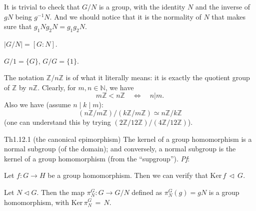 \documentclass{article}
\newcommand{\nles}{\vartriangleleft}
\newcommand{\Ker}{\text{Ker}\,}
\begin{document}
\begin{Rmk}{}
    \begin{compactenum}
        \item It is trivial to check that $G/N$ is a group, \textcolor{Th}{with the identity $N$ and the inverse of $gN$ being $g^{-1}N$}. And we should notice that it is the normality of $N$ that makes sure that $g_1Ng_2N = g_1g_2N$.
        \item \textcolor{Th}{$|G/N| = [G:N]$}.
        \item \textcolor{Th}{$G/{1} = \{G\}$, $G/G = \{1\}$}.
        \item \textcolor{Th}{The notation $\mathbb{Z}/n\mathbb{Z}$ is of what it literally means: it is exactly the quotient group of $\mathbb{Z}$ by $n\mathbb{Z}$. Clearly, for $m,n\in\mathbb{N}$, we have
        $$ m\mathbb{Z}<n\mathbb{Z} \quad \Longleftrightarrow \quad n|m. $$
        Also we have (assume $n\mid k\mid m$):
        $$ (n\mathbb{Z}/m\mathbb{Z})\Big/ (k\mathbb{Z}/m\mathbb{Z}) \simeq n\mathbb{Z}/k\mathbb{Z} $$
        (one can understand this by trying $(2\mathbb{Z}/12\mathbb{Z})\big/ (4\mathbb{Z}/12\mathbb{Z})$).}
    \end{compactenum}
\end{Rmk}

\begin{Th}{Th1.12.1 (the canonical epimorphism)}
    The kernel of a group homomorphism is a normal subgroup (of the domain); and conversely, a normal subgroup is the kernel of a group homomorphism (from the ``supgroup'').
    \tcblower
    \textit{Pf}: 
    \begin{compactenum}
        \item Let $f: G\to H$ be a group homomorphism. Then we can verify that $\Ker f \,\nles\, G$.
        \item Let $N\nles G$. Then the map $\pi_N^G: G\to G/N$ defined as $\pi_N^G(g) = gN$ is a group homomorphism, with $\Ker \pi_N^G \,=\, N$.
    \end{compactenum}
\end{Th}
\end{document}

